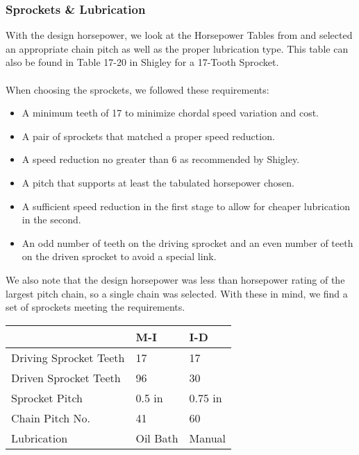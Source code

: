 \documentclass[letterpaper,12pt]{article}
\begin{document}
\subsubsection{Sprockets \& Lubrication}
With the design horsepower, we look at the Horsepower Tables from \cite{martin} and selected an appropriate chain pitch as well as the proper lubrication type. This table can also be found in Table 17-20 in Shigley for a 17-Tooth Sprocket.
\\\\
When choosing the sprockets, we followed these requirements:
\begin{itemize}
    \itemsep0em
    \item A minimum teeth of 17 to minimize chordal speed variation and cost.
    \item A pair of sprockets that matched a proper speed reduction.
    \item A speed reduction no greater than 6 as recommended by Shigley.
    \item A pitch that supports at least the tabulated horsepower chosen.
    \item A sufficient speed reduction in the first stage to allow for cheaper lubrication in the second.
    \item An odd number of teeth on the driving sprocket and an even number of teeth on the driven sprocket to avoid a special link.
\end{itemize}
We also note that the design horsepower was less than horsepower rating of the largest pitch chain, so a single chain was selected. With these in mind, we find a set of sprockets meeting the requirements.
\begin{center}
	\begin{tabular}{|p{4cm}|p{1.5cm}|p{1.5cm}| }
		\hline
		& M-I & I-D \\
		\hline
		Driving Sprocket Teeth & 17 & 17\\
		Driven Sprocket Teeth & 96 & 30\\
		Sprocket Pitch & 0.5 in & 0.75 in\\
		Chain Pitch No. & 41 & 60 \\
		Lubrication & Oil Bath & Manual \\
		\hline
	\end{tabular}
\end{center}
\end{document}
